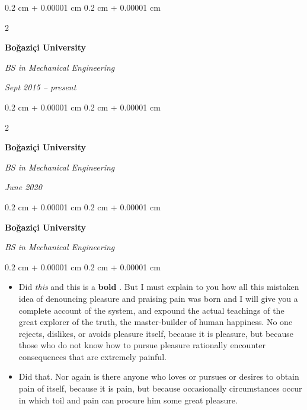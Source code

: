 \documentclass[10pt, letterpaper]{article}
\newenvironment{highlights}{
    \begin{itemize}[
        topsep=0.10 cm,
        parsep=0.10 cm,
        partopsep=0pt,
        itemsep=0pt,
        leftmargin=0.4 cm + 10pt
    ]
}{
    \end{itemize}
} %
\newenvironment{onecolentry}{
    \begin{adjustwidth}{
        0.2 cm + 0.00001 cm
    }{
        0.2 cm + 0.00001 cm
    }
}{
    \end{adjustwidth}
} %
\newenvironment{twocolentry}[2][]{
    \onecolentry
    \def\secondColumn{#2}
    \setcolumnwidth{\fill, 4.5 cm}
    \begin{paracol}{2}
}{
    \switchcolumn \raggedleft \secondColumn
    \end{paracol}
    \endonecolentry
} %
\let\hrefWithoutArrow\href
\renewcommand{\href}[2]{\hrefWithoutArrow{#1}{\ifthenelse{\equal{#2}{}}{ }{#2 }\raisebox{.15ex}{\footnotesize \faExternalLink*}}}
\begin{document}
        \vspace{0.2 cm}

        \begin{twocolentry}{
            
            
        \textit{Sept 2015 – present}}
            \textbf{Boğaziçi University}

            \textit{BS in Mechanical Engineering}
        \end{twocolentry}



        \vspace{0.2 cm}

        \begin{twocolentry}{
            
            
        \textit{June 2020}}
            \textbf{Boğaziçi University}

            \textit{BS in Mechanical Engineering}
        \end{twocolentry}



        \vspace{0.2 cm}

        \begin{onecolentry}
            \textbf{Boğaziçi University}

            \textit{BS in Mechanical Engineering}
        \end{onecolentry}

        \vspace{0.10 cm}
        \begin{onecolentry}
            \begin{highlights}
                \item Did \textit{this} and this is a \textbf{bold} \href{https://example.com}{link}. But I must explain to you how all this mistaken idea of denouncing pleasure and praising pain was born and I will give you a complete account of the system, and expound the actual teachings of the great explorer of the truth, the master-builder of human happiness. No one rejects, dislikes, or avoids pleasure itself, because it is pleasure, but because those who do not know how to pursue pleasure rationally encounter consequences that are extremely painful.
                \item Did that. Nor again is there anyone who loves or pursues or desires to obtain pain of itself, because it is pain, but because occasionally circumstances occur in which toil and pain can procure him some great pleasure.
            \end{highlights}
        \end{onecolentry}
\end{document}
